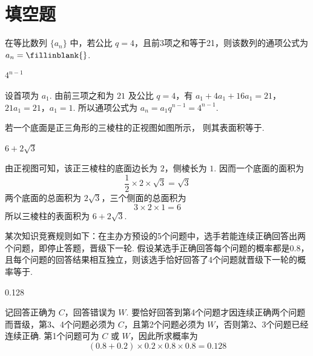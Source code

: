 \section{填空题}

\begin{problem}
在等比数列 \(\{a_{n}\}\) 中，若公比 \(q = 4\)，且前3项之和等于21，则该数列的通项公式为 \(a_{n} =\fillinblank{}\).
\end{problem}

\begin{answer}
\(4^{n-1}\)
\end{answer}

\begin{solution}
设首项为 \(a_{1}\). 由前三项之和为 \(21\) 及公比 \(q=4\)，有
\(a_{1}+4a_{1}+16a_{1}=21\)，\(21a_{1}=21\)，\(a_{1}=1\).
所以通项公式为 \(a_{n}=a_{1}q^{n-1}=4^{n-1}\).
\end{solution}

\begin{problem}
若一个底面是正三角形的三棱柱的正视图如图所示，
则其表面积等于\fillinblank{}.
\end{problem}

\begin{answer}
\(6 + 2\sqrt{3}\)
\end{answer}

\begin{solution}
由正视图可知，该正三棱柱的底面边长为 \(2\)，侧棱长为 \(1\). 因而一个底面的面积为
\[
\frac{1}{2}\times2\times\sqrt{3}=\sqrt{3}
\]
两个底面的总面积为 \(2\sqrt{3}\)，三个侧面的总面积为
\[
3\times2\times1=6
\]
所以三棱柱的表面积为 \(6+2\sqrt{3}\).
\end{solution}

\begin{problem}
某次知识竞赛规则如下：在主办方预设的5个问题中，选手若能连续正确回答出两个问题，即停止答题，晋级下一轮. 假设某选手正确回答每个问题的概率都是0.8，且每个问题的回答结果相互独立，则该选手恰好回答了4个问题就晋级下一轮的概率等于\fillinblank{}.
\end{problem}

\begin{answer}
0.128
\end{answer}

\begin{solution}
记回答正确为 \(C\)，回答错误为 \(W\). 要恰好回答到第4个问题才因连续正确两个问题而晋级，第3、4个问题必须为 \(C\)，且第2个问题必须为 \(W\)，否则第2、3个问题已经连续正确. 第1个问题可为 \(C\) 或 \(W\)，因此所求概率为
\[
(0.8+0.2)\times0.2\times0.8\times0.8=0.128
\]
\end{solution}

